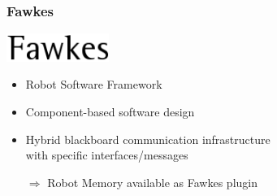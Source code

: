 \begin{frame}
  \frametitle{Fawkes}
  \includegraphics[width=0.25\textwidth]{../thesis/img/fawkes}  
  \bigskip
  \begin{itemize}
    \item Robot Software Framework %
    \item Component-based software design %
    \item Hybrid blackboard communication infrastructure\\ with specific interfaces/messages %
      \skip
    \item[$\Rightarrow$] Robot Memory available as Fawkes plugin
  \end{itemize}
\end{frame}

\setcounter{framenumber}{\value{finalframe}}


